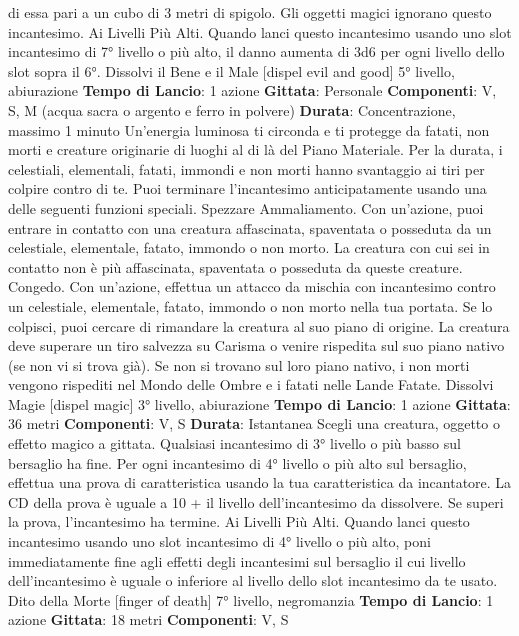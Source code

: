 \begin{multicols}{2}
di essa pari a un cubo di 3 metri di spigolo. Gli oggetti
magici ignorano questo incantesimo.
Ai Livelli Più Alti. Quando lanci questo incantesimo
usando uno slot incantesimo di 7° livello o più alto, il
danno aumenta di 3d6 per ogni livello dello slot sopra il
6°.
Dissolvi il Bene e il Male
[dispel evil and good]
5° livello, abiurazione
\textbf{Tempo di Lancio}: 1 azione
\textbf{Gittata}: Personale
\textbf{Componenti}: V, S, M (acqua sacra o argento e ferro in
polvere)
\textbf{Durata}: Concentrazione, massimo 1 minuto
Un’energia luminosa ti circonda e ti protegge da fatati,
non morti e creature originarie di luoghi al di là del
Piano Materiale. Per la durata, i celestiali, elementali,
fatati, immondi e non morti hanno svantaggio ai tiri per
colpire contro di te.
Puoi terminare l’incantesimo anticipatamente usando
una delle seguenti funzioni speciali.
Spezzare Ammaliamento. Con un’azione, puoi entrare
in contatto con una creatura affascinata, spaventata o
posseduta da un celestiale, elementale, fatato,
immondo o non morto. La creatura con cui sei in
contatto non è più affascinata, spaventata o posseduta
da queste creature.
Congedo. Con un’azione, effettua un attacco da
mischia con incantesimo contro un celestiale,
elementale, fatato, immondo o non morto nella tua
portata. Se lo colpisci, puoi cercare di rimandare la
creatura al suo piano di origine. La creatura deve
superare un tiro salvezza su Carisma o venire rispedita
sul suo piano nativo (se non vi si trova già). Se non si
trovano sul loro piano nativo, i non morti vengono
rispediti nel Mondo delle Ombre e i fatati nelle Lande
Fatate.
Dissolvi Magie
[dispel magic]
3° livello, abiurazione
\textbf{Tempo di Lancio}: 1 azione
\textbf{Gittata}: 36 metri
\textbf{Componenti}: V, S
\textbf{Durata}: Istantanea
Scegli una creatura, oggetto o effetto magico a gittata.
Qualsiasi incantesimo di 3° livello o più basso sul
bersaglio ha fine. Per ogni incantesimo di 4° livello o più
alto sul bersaglio, effettua una prova di caratteristica
usando la tua caratteristica da incantatore. La CD della
prova è uguale a 10 + il livello dell’incantesimo da
dissolvere. Se superi la prova, l’incantesimo ha termine.
Ai Livelli Più Alti. Quando lanci questo incantesimo
usando uno slot incantesimo di 4° livello o più alto, poni
immediatamente fine agli effetti degli incantesimi sul
bersaglio il cui livello dell’incantesimo è uguale o
inferiore al livello dello slot incantesimo da te usato.
Dito della Morte
[finger of death]
7° livello, negromanzia
\textbf{Tempo di Lancio}: 1 azione
\textbf{Gittata}: 18 metri
\textbf{Componenti}: V, S

\end{multicols}
